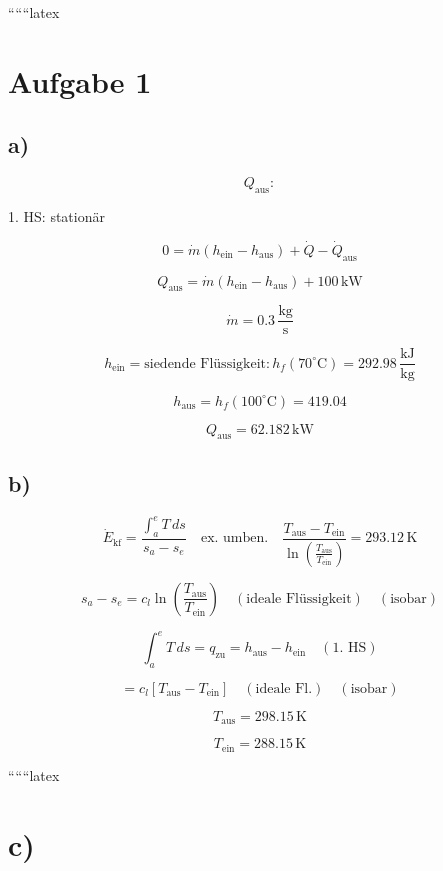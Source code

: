 
``````latex


\section*{Aufgabe 1}

\subsection*{a)}

\[
Q_{\text{aus}}:
\]

1. HS: stationär

\[
0 = \dot{m} \left( h_{\text{ein}} - h_{\text{aus}} \right) + \dot{Q} - \dot{Q}_{\text{aus}}
\]

\[
Q_{\text{aus}} = \dot{m} \left( h_{\text{ein}} - h_{\text{aus}} \right) + 100 \, \text{kW}
\]

\[
\dot{m} = 0.3 \, \frac{\text{kg}}{\text{s}}
\]

\[
h_{\text{ein}} = \text{siedende Flüssigkeit:} \, h_f (70^\circ \text{C}) = 292.98 \, \frac{\text{kJ}}{\text{kg}}
\]

\[
h_{\text{aus}} = h_f (100^\circ \text{C}) = 419.04
\]

\[
Q_{\text{aus}} = 62.182 \, \text{kW}
\]

\subsection*{b)}

\[
\dot{E}_{\text{kf}} = \frac{\int_a^e T \, ds}{s_a - s_e} \quad \text{ex. umben.} \quad \frac{T_{\text{aus}} - T_{\text{ein}}}{\ln \left( \frac{T_{\text{aus}}}{T_{\text{ein}}} \right)} = 293.12 \, \text{K}
\]

\[
s_a - s_e = c_{l} \ln \left( \frac{T_{\text{aus}}}{T_{\text{ein}}} \right) \quad (\text{ideale Flüssigkeit}) \quad (\text{isobar})
\]

\[
\int_a^e T \, ds = q_{\text{zu}} = h_{\text{aus}} - h_{\text{ein}} \quad (\text{1. HS})
\]

\[
= c_{l} \left[ T_{\text{aus}} - T_{\text{ein}} \right] \quad (\text{ideale Fl.}) \quad (\text{isobar})
\]

\[
T_{\text{aus}} = 298.15 \, \text{K}
\]

\[
T_{\text{ein}} = 288.15 \, \text{K}
\]

``````latex


\section*{c)}

